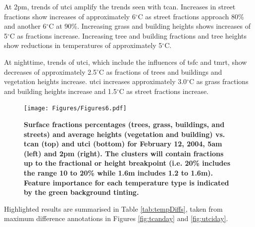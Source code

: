 \documentclass[final,3p,times,authoryear]{elsarticle}
\begin{document}
At 2pm, trends of \gls{utci} amplify the trends seen with \gls{tcan}. Increases in street fractions show increases of approximately 6$^{\circ}$C as street fractions approach 80\% and another 6$^{\circ}$C at 90\%. Increasing grass and building heights shows increases of 5$^{\circ}$C as fractions increase. Increasing tree and building fractions and tree heights show reductions in temperatures of approximately 5$^{\circ}$C.

At nighttime, trends of \gls{utci}, which include the influences of \gls{tsfc} and \gls{tmrt}, show decreases of approximately 2.5$^{\circ}$C as fractions of trees and buildings and vegetation heights increase. \gls{utci} increases approximately 3.0$^{\circ}$C as grass fractions and building heights increase and 1.5$^{\circ}$C as street fractions increase.



\begin{figure}
\centering
\texttt{[image: Figures/Figures6.pdf]}
\caption{\bf Surface fractions percentages (trees, grass, buildings, and streets) and average heights (vegetation and building) vs. \gls{tcan} (top) and \gls{utci} (bottom) for February 12, 2004, 5am (left) and 2pm (right). The clusters will contain fractions up to the fractional or height breakpoint (i.e. 20\% includes the range 10 to 20\%  while 1.6m includes 1.2 to 1.6m). Feature importance for each temperature type is indicated by the green background tinting.}
 \label{fig:box5a} \label{fig:box14a}
\end{figure} 

Highlighted results are summarised in Table \ref{tab:tempDiffs}, taken from maximum difference annotations in Figures \ref{fig:tcanday} and \ref{fig:utciday}.

\end{document}
